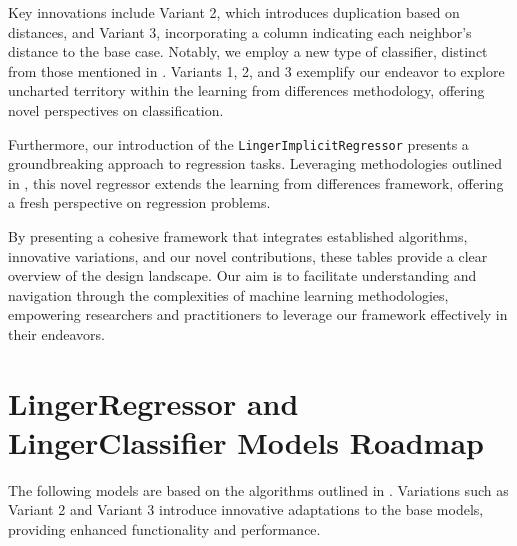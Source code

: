 \documentclass[a4paper, 12pt]{report}
\begin{document}
Key innovations include Variant 2, which introduces duplication based on distances, and Variant 3, incorporating a column indicating each neighbor's distance to the base case. 
Notably, we employ a new type of classifier, distinct from those mentioned in \cite{learningFromDifferences2022}. 
Variants 1, 2, and 3 exemplify our endeavor to explore uncharted territory within the learning from differences methodology, offering novel perspectives on classification.

Furthermore, our introduction of the \texttt{LingerImplicitRegressor} presents a groundbreaking approach to regression tasks. 
Leveraging methodologies outlined in \cite{ye2021learning}, this novel regressor extends the learning from differences framework, 
offering a fresh perspective on regression problems.

By presenting a cohesive framework that integrates established algorithms, innovative variations, and our novel contributions, these tables 
provide a clear overview of the design landscape. Our aim is to facilitate understanding and navigation through the complexities of machine learning methodologies, 
empowering researchers and practitioners to leverage our framework effectively in their endeavors.


\section{LingerRegressor and LingerClassifier Models Roadmap}
The following models are based on the algorithms outlined in \cite{learningFromDifferences2022}. 
Variations such as Variant 2 and Variant 3 introduce innovative adaptations to the base models, 
providing enhanced functionality and performance.
\end{document}
